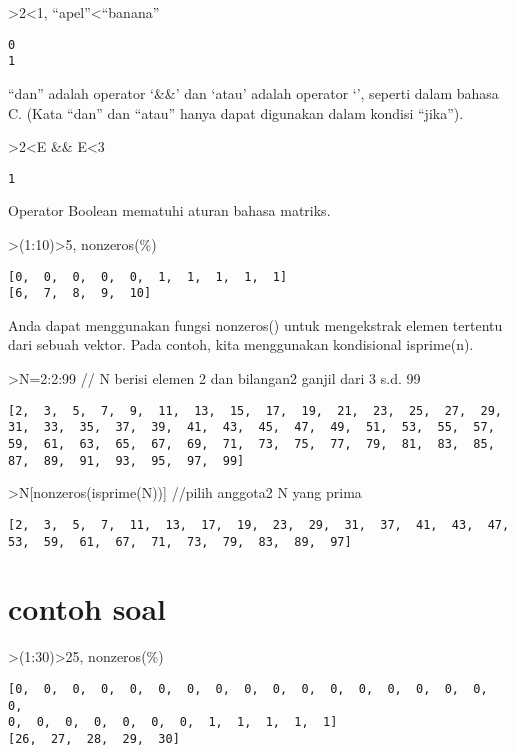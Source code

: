 \documentclass[
]{book}
\begin{document}
\textgreater2\textless1, ``apel''\textless{}``banana''

\begin{verbatim}
0
1
\end{verbatim}

``dan'' adalah operator `\&\&' dan `atau' adalah operator `\textbar\textbar{}', seperti dalam bahasa C. (Kata ``dan'' dan ``atau'' hanya dapat digunakan dalam kondisi ``jika'').

\textgreater2\textless E \&\& E\textless3

\begin{verbatim}
1
\end{verbatim}

Operator Boolean mematuhi aturan bahasa matriks.

\textgreater(1:10)\textgreater5, nonzeros(\%)

\begin{verbatim}
[0,  0,  0,  0,  0,  1,  1,  1,  1,  1]
[6,  7,  8,  9,  10]
\end{verbatim}

Anda dapat menggunakan fungsi nonzeros() untuk mengekstrak elemen tertentu dari sebuah vektor. Pada contoh, kita menggunakan kondisional isprime(n).

\textgreater N=2:2:99 // N berisi elemen 2 dan bilangan2 ganjil dari 3 s.d. 99

\begin{verbatim}
[2,  3,  5,  7,  9,  11,  13,  15,  17,  19,  21,  23,  25,  27,  29,
31,  33,  35,  37,  39,  41,  43,  45,  47,  49,  51,  53,  55,  57,
59,  61,  63,  65,  67,  69,  71,  73,  75,  77,  79,  81,  83,  85,
87,  89,  91,  93,  95,  97,  99]
\end{verbatim}

\textgreater N{[}nonzeros(isprime(N)){]} //pilih anggota2 N yang prima

\begin{verbatim}
[2,  3,  5,  7,  11,  13,  17,  19,  23,  29,  31,  37,  41,  43,  47,
53,  59,  61,  67,  71,  73,  79,  83,  89,  97]
\end{verbatim}

\section{contoh soal}\label{contoh-soal-3}

\textgreater(1:30)\textgreater25, nonzeros(\%)

\begin{verbatim}
[0,  0,  0,  0,  0,  0,  0,  0,  0,  0,  0,  0,  0,  0,  0,  0,  0,  0,
0,  0,  0,  0,  0,  0,  0,  1,  1,  1,  1,  1]
[26,  27,  28,  29,  30]
\end{verbatim}
\end{document}
